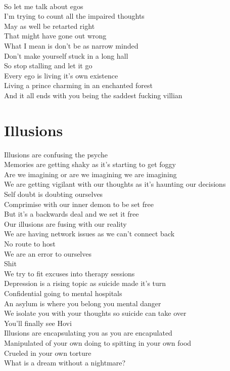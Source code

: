 \documentclass[12pt, b5paper, oneside]{book}
\begin{document}
\\So let me talk about egos 
\\I'm trying to count all the impaired thoughts 
\\May as well be retarted right
\\That might have gone out wrong 
\\What I mean is don't be as narrow minded
\\Don't make yourself stuck in a long hall
\\So stop stalling and let it go
\\Every ego is living it's own existence 
\\Living a prince charming in an enchanted forest 
\\And it all ends with you being the saddest fucking villian

\newpage 
\section{Illusions}
Illusions are confusing the psyche 
\\Memories are getting shaky as it's starting to get foggy
\\Are we imagining or are we imagining we are imagining 
\\We are getting vigilant with our thoughts as it's haunting our decisions 
\\Self doubt is doubting ourselves
\\Comprimise with our inner demon to be set free
\\But it's a backwards deal and we set it free
\\Our illusions are fusing with our reality 
\\We are having network issues as we can't connect back
\\No route to host 
\\We are an error to ourselves 
\\Shit 
\\We try to fit excuses into therapy sessions 
\\Depression is a rising topic as suicide made it's turn 
\\Confidential going to mental hospitals 
\\An asylum is where you belong you mental danger 
\\We isolate you with your thoughts so suicide can take over
\\You'll finally see Hovi
\\Illusions are encapsulating you as you are encapulated 
\\Manipulated of your own doing to spitting in your own food 
\\Crueled in your own torture 
\\What is a dream without a nightmare?
\newpage
\end{document}
